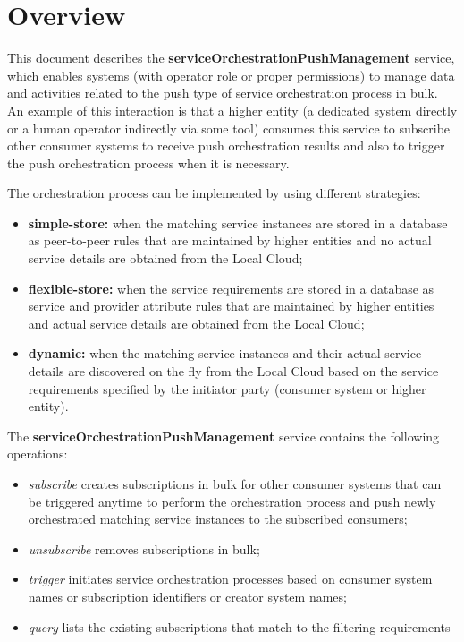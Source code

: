 \documentclass[a4paper]{arrowhead}
\begin{document}
\section{Overview}
\label{sec:overview}
This document describes the \textbf{serviceOrchestrationPushManagement} service, which enables systems (with operator role or proper permissions) to manage data and activities related to the push type of service orchestration process in bulk. An example of this interaction is that a higher entity (a dedicated system directly or a human operator indirectly via some tool) consumes this service to subscribe other consumer systems to receive push orchestration results and also to trigger the push orchestration process when it is necessary.

The orchestration process can be implemented by using different strategies:

\begin{itemize}
    \item \textbf{simple-store:} when the matching service instances are stored in a database as peer-to-peer rules that are maintained by higher entities and no actual service details are obtained from the Local Cloud;
    \item \textbf{flexible-store:} when the service requirements are stored in a database as service and provider attribute rules that are maintained by higher entities and actual service details are obtained from the Local Cloud;
    \item \textbf{dynamic:} when the matching service instances and their actual service details are discovered on the fly from the Local Cloud based on the service requirements specified by the initiator party (consumer system or higher entity).
\end{itemize}

The \textbf{serviceOrchestrationPushManagement} service contains the following operations:

\begin{itemize}
    \item \textit{subscribe} creates subscriptions in bulk for other consumer systems that can be triggered anytime to perform the orchestration process and push newly orchestrated matching service instances to the subscribed consumers;
    \item \textit{unsubscribe} removes subscriptions in bulk;
    \item \textit{trigger} initiates service orchestration processes based on consumer system names or subscription identifiers or creator system names;
    \item \textit{query} lists the existing subscriptions that match to the filtering requirements
\end{itemize}
\end{document}

